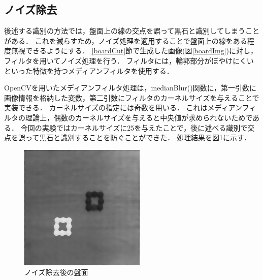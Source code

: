 \documentclass[openright]{nitocs}
\numberwithin{equation}{section}
\begin{document}
        \subsection{ノイズ除去}
        \label{noiseReduce}
            後述する識別の方法では，盤面上の線の交点を誤って黒石と識別してしまうことがある．
            これを減らすため，ノイズ処理を適用することで盤面上の線をある程度無視できるようにする． 
            \ref{boardCut}節で生成した画像(図\ref{boardImg})に対し，フィルタを用いてノイズ処理を行う．
            フィルタには，輪郭部分がぼやけにくいといった特徴を持つメディアンフィルタを使用する．
            
            OpenCVを用いたメディアンフィルタ処理は，medianBlur()関数に，第一引数に画像情報を格納した変数，第二引数にフィルタのカーネルサイズを与えることで実装できる．
            カーネルサイズの指定には奇数を用いる．
            これはメディアンフィルタの理論上，偶数のカーネルサイズを与えると中央値が求められないためである．
            今回の実験ではカーネルサイズに25を与えたことで，後に述べる識別で交点を誤って黒石と識別することを防ぐことができた．
            処理結果を図\ref{noiseReducedImg}に示す．
            \begin{figure}[tb] %
                \begin{center}
                \includegraphics[clip,width=60mm]{noiseReducedImg.jpg} 
                \caption{ノイズ除去後の盤面}
                \label{noiseReducedImg}
                \end{center}
            \end{figure}
\end{document}
